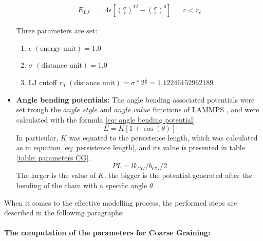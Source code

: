 \begin{itemize}
    \begin{align} \label{eq: lennard jones potential}
        E_{LJ} &= 4 \epsilon \left[\left(\frac{\sigma}{r}\right)^{12} - \left(\frac{\sigma}{r}\right)^6\right]&& r < r_c
    \end{align}

    Three parameters are set:

    \begin{enumerate} %
        \item $\epsilon$ $(\text{energy unit}) = 1.0$
        \item $\sigma$ $(\text{distance unit}) = 1.0$
        \item LJ cutoff $r_0$ $(\text{distance unit}) = \sigma * 2^{\frac{1}{6}} = 1.12246152962189$
    \end{enumerate}

    \item \textbf{Angle bending potentials: }The angle bending associated potentials were set trough the $angle\_style$ and $angle\_value$ functions of LAMMPS
    \cite{thompsonLAMMPSFlexibleSimulation2022},
    and were calculated with the formula \ref{eq: angle bending potential}.
    \begin{equation} \label{eq: angle bending potential}
        E = K[1 + \cos{(\theta)}]    
    \end{equation}
    In particular, $K$ was equated to the persistence length, which was calculated as in equation \ref{eq: persistence length}, and its value is presented in table \ref{table: parameters CG}. 
    \begin{equation} \label{eq: persistence length}
        PL = lk_{CG} / b_{CG} / 2
    \end{equation}
    The larger is the value of $K$, the bigger is the potential generated after the bending of the chain with a specific angle $\theta$.

\end{itemize}

\noindent When it comes to the effective modelling process, the performed steps are described in the following paragraphs:


\paragraph{The computation of the parameters for Coarse Graining:}


